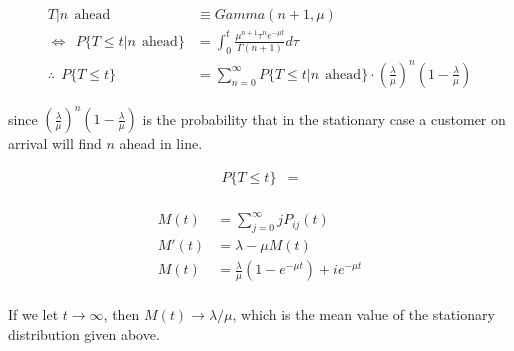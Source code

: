 \documentclass[12pt]{article}
\theoremstyle{nonumberbreak}
\begin{document}
$$
\begin{aligned}
T | n \ \ \mathrm{ahead} &\equiv Gamma(n+1, \mu) \\[8pt]
\Leftrightarrow \ \ P \{ T \le t | n \ \ \mathrm{ahead}  \} &= \int_0^t \frac{\mu^{n+1} \tau^n e^{-\mu t} }{\Gamma(n+1)} d\tau \\[10pt]
\therefore \ \ P \{ T \le t\} &= \sum_{n=0}^\infty P \{ T \le t | n \ \ \mathrm{ahead} \} \cdot (\frac{\lambda}{\mu})^n (1 - \frac{\lambda}{\mu})
\end{aligned}
$$  

since $(\frac{\lambda}{\mu})^n (1 - \frac{\lambda}{\mu})$ is the probability that in the stationary case a customer on arrival will find $n$ ahead in line. 


$$
\begin{aligned}
P \{ T \le t\} &= \\[8pt]
\end{aligned}
$$



$$
\begin{aligned}
M(t) &= \sum_{j=0}^\infty j P_{ij}(t) \\[8pt]
M'(t) &= \lambda - \mu M(t) \\[8pt]
M(t) &= \frac{\lambda}{\mu} (1 - e^{-\mu t}) + i e^{-\mu t} \\[8pt]
\end{aligned}
$$

If we let $t \to \infty$, then $M(t) \to \lambda/\mu$, which is the mean value of the stationary distribution given above. 
\end{document}
